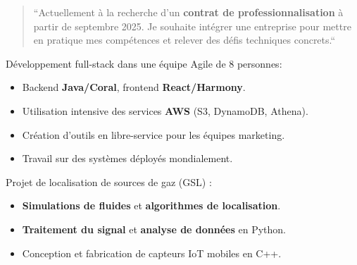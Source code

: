 \documentclass[10pt,a4paper,ragged2e,withhyper]{../AltaCV/altacv}
\begin{document}



\makecvheader


\begin{paracol}{2}


  \begin{quote}
    \small
    ``Actuellement à la recherche d'un \textbf{contrat de professionnalisation} à partir de septembre 2025.
    Je souhaite intégrer une entreprise pour mettre en pratique mes compétences et relever des défis techniques concrets.``
  \end{quote}


  Développement full-stack dans une équipe Agile de 8 personnes:

  \begin{itemize}
    \item Backend \textbf{Java/Coral}, frontend \textbf{React/Harmony}.
    \item Utilisation intensive des services \textbf{AWS} (S3, DynamoDB, Athena).
    \item Création d'outils en libre-service pour les équipes marketing.
    \item Travail sur des systèmes déployés mondialement.
  \end{itemize}

  \divider

  Projet de localisation de sources de gaz (GSL) :
  \begin{itemize}
    \item \textbf{Simulations de fluides} et \textbf{algorithmes de localisation}.
    \item \textbf{Traitement du signal} et \textbf{analyse de données} en Python.
    \item Conception et fabrication de capteurs IoT mobiles en C++.
  \end{itemize}


\end{paracol}
\end{document}
